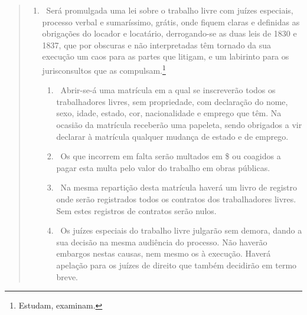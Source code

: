 {\begin{quote}
\begin{enumerate}[label=Art. \arabic*º]
\begin{enumerate}[label=§ \arabic*º]
\item\ Para criação de fundos para esta indenização será levantado, desde
já, um imposto anual de 3\$000 por cabeça de escravo.

A soma arrecadada será recolhida para bancos territoriais, os quais se
encarregarão da referida indenização, e só poderão fazer empréstimos à
lavoura diretamente.

\item\ O governo por seus regulamentos garantirá e resguardará o
interesse desses bancos, estatuindo sobre o modo e condições do
empréstimo, e favorecendo as necessidades da lavoura.
\end{enumerate}

\item\ Será promulgada uma lei sobre o trabalho livre com juízes
especiais, processo verbal e sumaríssimo, grátis, onde fiquem claras e
definidas as obrigações do locador e locatário, derrogando-se as duas
leis de 1830 e 1837, que por obscuras e não interpretadas têm tornado da
sua execução um caos para as partes que litigam, e um labirinto para os
jurisconsultos que as compulsam.\footnote{Estudam, examinam.}

\begin{enumerate}[label=§ \arabic*º]
\item\ Abrir-se-á uma matrícula em a qual se inscreverão todos os
trabalhadores livres, sem propriedade, com declaração do nome, sexo,
idade, estado, cor, nacionalidade e emprego que têm. Na ocasião da
matrícula receberão uma papeleta, sendo obrigados a vir declarar à
matrícula qualquer mudança de estado e de emprego.

\item\ Os que incorrem em falta serão multados em \$ ou coagidos a pagar
esta multa pelo valor do trabalho em obras públicas.

\item\ Na mesma repartição desta matrícula haverá um livro de registro
onde serão registrados todos os contratos dos trabalhadores livres. Sem
estes registros de contratos serão nulos.

\item\ Os juízes especiais do trabalho livre julgarão sem demora, dando a
sua decisão na mesma audiência do processo. Não haverão embargos nestas
causas, nem mesmo os à execução. Haverá apelação para os juízes de
direito que também decidirão em termo breve.


\end{enumerate}
\end{enumerate}
\end{quote}}

